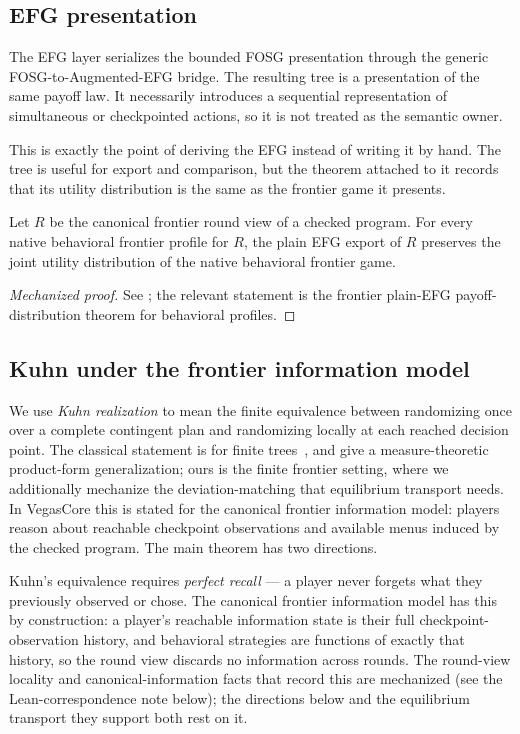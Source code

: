 \subsection{EFG presentation}
\label{sec:pres:efg}

The EFG layer serializes the bounded FOSG presentation through the
generic FOSG-to-Augmented-EFG bridge.  The resulting tree is a
presentation of the same payoff law.  It necessarily introduces a
sequential representation of simultaneous or checkpointed actions, so it
is not treated as the semantic owner.

This is exactly the point of deriving the EFG instead of writing it by
hand.  The tree is useful for export and comparison, but the theorem
attached to it records that its utility distribution is the same as the
frontier game it presents.

\begin{theorem}
\label{thm:efg}
Let \(R\) be the canonical frontier round view of a checked program.
For every native behavioral frontier profile for \(R\), the plain EFG
export of \(R\) preserves the joint utility distribution of the native
behavioral frontier game.
\end{theorem}

\begin{proof}[Mechanized proof]
See ; the relevant statement is the
frontier plain-EFG payoff-distribution theorem for behavioral profiles.
\end{proof}

\subsection{Kuhn under the frontier information model}
\label{sec:pres:kuhn}

We use \emph{Kuhn realization} to mean the finite equivalence between
randomizing once over a complete contingent plan and randomizing locally
at each reached decision point.  The classical statement is for finite
trees~\citep{Kuhn1953}, and \citet{Heymann2022KuhnProduct} give a
measure-theoretic product-form generalization; ours is the finite frontier
setting, where we additionally mechanize the deviation-matching that
equilibrium transport needs.  In VegasCore this is
stated for the canonical frontier information model: players reason about
reachable checkpoint observations and available menus induced by the checked
program.  The main theorem has two directions.

Kuhn's equivalence requires \emph{perfect recall} --- a player never forgets
what they previously observed or chose.  The canonical frontier information
model has this by construction: a player's reachable information state is their
full checkpoint-observation history, and behavioral strategies are functions of
exactly that history, so the round view discards no information across rounds.
The round-view locality and canonical-information facts that record this are
mechanized (see the Lean-correspondence note below); the directions below and
the equilibrium transport they support both rest on it.

